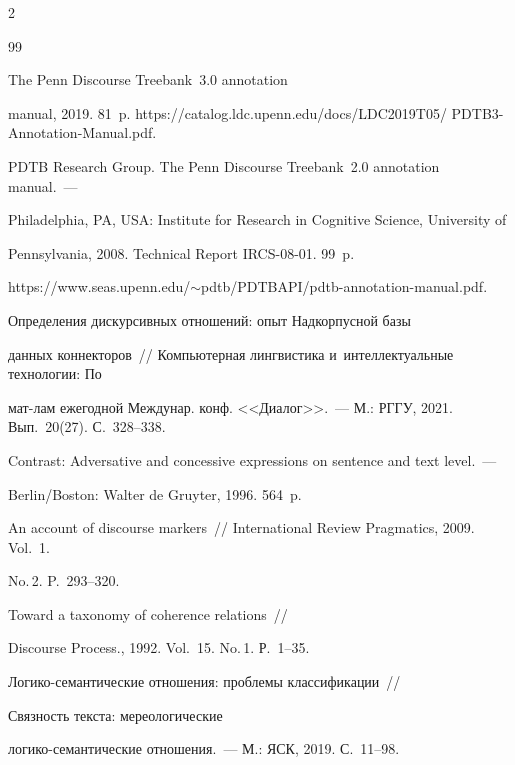 \begin{multicols}{2}
{{\begin{thebibliography}{99}


 The Penn Discourse Treebank~3.0 annotation 


manual, 2019. 81~p. {\sf https://catalog.ldc.upenn.edu/docs/LDC2019T05/ PDTB3-Annotation-Manual.pdf}.




PDTB Research Group. The Penn Discourse Treebank~2.0 annotation manual.~--- 


Philadelphia, PA, USA: Institute for Research in Cognitive Science, University of 


Pennsylvania, 2008. Technical Report IRCS-08-01. 99~p. 


{\sf https://www.seas.upenn.edu/$\sim$pdtb/PDTBAPI/pdtb-annotation-manual.pdf}.




 Определения дискурсивных отношений: опыт Надкорпусной базы 


данных коннекторов~// Компьютерная лингвистика и~интеллектуальные технологии: По 


мат-лам ежегодной \mbox{Междунар.} конф. <<Диалог>>.~--- М.: РГГУ, 2021. Вып.~20(27). С.~328--338.




 Contrast: Adversative and concessive expressions on sentence and text level.~--- 


Berlin/Boston: Walter de Gruyter, 1996. 564~p.




 An account of discourse markers~// International Review Pragmatics, 2009. Vol.~1. 


No.\,2. P.~293--320.




 Toward a taxonomy of coherence relations~// 


Discourse Process., 1992. Vol.~15. No.\,1. Р.~1--35.




 Логико-семантические отношения: проблемы классификации~// 


Связ\-ность текста: мереологические 


ло\-ги\-ко-се\-ман\-ти\-че\-ские отношения.~--- М.: ЯСК, 2019. С.~11--98.







\end{thebibliography}}}
\end{multicols}
